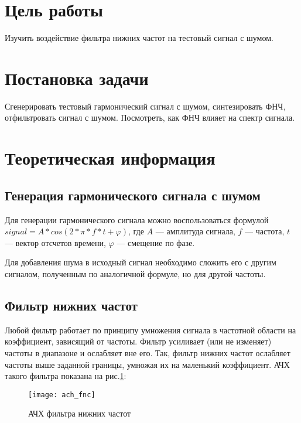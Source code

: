 







\section{Цель работы}
Изучить воздействие фильтра нижних частот на тестовый сигнал с шумом.

\section{Постановка задачи}
Сгенерировать тестовый гармонический сигнал с шумом, синтезировать ФНЧ, отфильтровать сигнал с шумом. Посмотреть, как ФНЧ влияет на спектр сигнала.

\section{Теоретическая информация}
\subsection{Генерация гармонического сигнала с шумом}
Для генерации гармонического сигнала можно воспользоваться формулой $signal = A*cos(2*\pi * f*t + \varphi)$,
 где $ A $ --- амплитуда сигнала, $f$ --- частота, $t$ --- вектор отсчетов времени, $\varphi$ --- смещение по фазе.

Для добавления шума в исходный сигнал необходимо сложить его с другим сигналом, полученным по аналогичной формуле, но для другой частоты.

\subsection{Фильтр нижних частот}
Любой фильтр работает по принципу умножения сигнала в частотной области на коэффициент, зависящий от частоты.
Фильтр усиливает (или не изменяет) частоты в диапазоне и ослабляет вне его. Так, фильтр нижних частот ослабляет частоты выше заданной границы, умножая их на маленький коэффициент. АЧХ такого фильтра показана на рис.\ref{pic:ach_fnc}:
\begin{figure}[H]
	\begin{center}
		\texttt{[image: ach\_fnc]}
		\caption{АЧХ фильтра нижних частот} 
		\label{pic:ach_fnc} %
	\end{center}
\end{figure}

